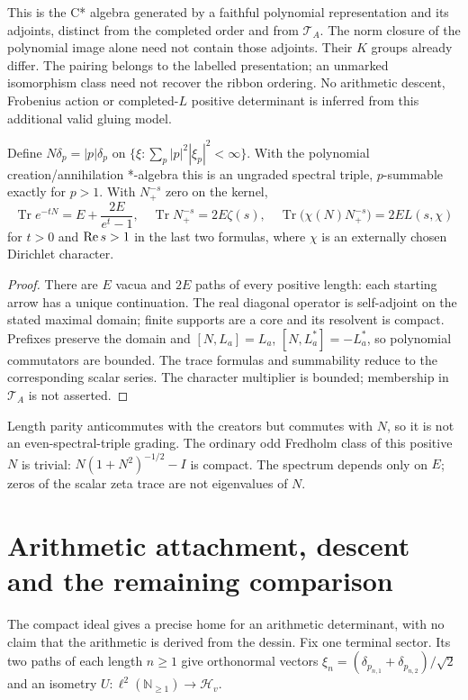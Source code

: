 This is the C* algebra generated by a faithful polynomial representation and its adjoints, distinct from the completed order and from $\mathcal T_A$. The norm closure of the polynomial image alone need not contain those adjoints. Their $K$ groups already differ. The pairing belongs to the labelled presentation; an unmarked isomorphism class need not recover the ribbon ordering. No arithmetic descent, Frobenius action or completed-$L$ positive determinant is inferred from this additional valid gluing model.


\begin{proposition}\label{thm:degree}
Define $N\delta_p=|p|\delta_p$ on $\{\xi:\sum_p|p|^2|\xi_p|^2<\infty\}$. With the polynomial creation/annihilation *-algebra this is an ungraded spectral triple, $p$-summable exactly for $p>1$. With $N_+^{-s}$ zero on the kernel,
\[
 \operatorname{Tr}e^{-tN}=E+\frac{2E}{e^t-1},\quad
 \operatorname{Tr}N_+^{-s}=2E\zeta(s),\quad
 \operatorname{Tr}\bigl(\chi(N)N_+^{-s}\bigr)=2E L(s,\chi)
\]
for $t>0$ and $\operatorname{Re} s>1$ in the last two formulas, where $\chi$ is an externally chosen Dirichlet character.
\end{proposition}
\begin{proof}
There are $E$ vacua and $2E$ paths of every positive length: each starting arrow has a unique continuation. The real diagonal operator is self-adjoint on the stated maximal domain; finite supports are a core and its resolvent is compact. Prefixes preserve the domain and $[N,L_a]=L_a$, $[N,L_a^*]=-L_a^*$, so polynomial commutators are bounded. The trace formulas and summability reduce to the corresponding scalar series. The character multiplier is bounded; membership in $\mathcal T_A$ is not asserted.
\end{proof}
Length parity anticommutes with the creators but commutes with $N$, so it is not an even-spectral-triple grading. The ordinary odd Fredholm class of this positive $N$ is trivial: $N(1+N^2)^{-1/2}-I$ is compact. The spectrum depends only on $E$; zeros of the scalar zeta trace are not eigenvalues of $N$.


\chapter{Arithmetic attachment, descent and the remaining comparison}
The compact ideal gives a precise home for an arithmetic determinant, with no claim that the arithmetic is derived from the dessin. Fix one terminal sector. Its two paths of each length $n\ge1$ give orthonormal vectors $\xi_n=(\delta_{p_{n,1}}+\delta_{p_{n,2}})/\sqrt2$ and an isometry $U:\ell^2(\mathbb N_{\ge1})\to\mathcal H_v$.

